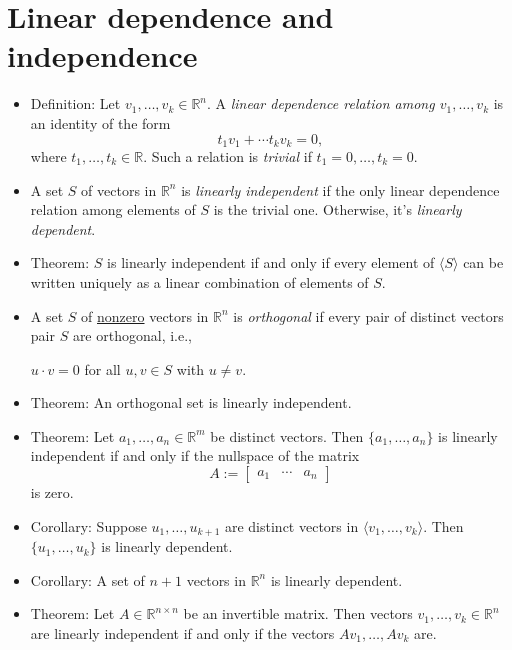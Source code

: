 \documentclass{amsart}
\newcommand{\RR}{\mathbb{R}}
\begin{document}
\section{Linear dependence and independence}
\begin{itemize}
  \setlength{\itemsep}{0.5em}
  \item Definition: Let $v_1,\ldots,v_k\in\RR^n$.
  A \emph{linear dependence relation among $v_1,\ldots,v_k$} is an identity of the form
  $$
  t_1v_1+\cdots t_kv_k=0,
  $$
  where $t_1,\ldots,t_k\in\RR$. Such a relation is \emph{trivial} if $t_1=0,\ldots, t_k=0$.

  \item A set $S$ of vectors in $\RR^n$ is \emph{linearly independent} if the only linear dependence relation among elements of $S$ is the trivial one.
  Otherwise, it's \emph{linearly dependent}.

  \item Theorem: $S$ is linearly independent if and only if every element of $\langle S\rangle$ can be written uniquely as a linear combination of elements of $S$.

  \item A set $S$ of \underline{nonzero} vectors in $\RR^n$ is \emph{orthogonal} if every pair of distinct vectors pair $S$ are orthogonal, i.e.,
  \begin{center}
    $u\cdot v = 0$ for all $u, v\in S$ with $u\neq v$.
  \end{center}

  \item Theorem: An orthogonal set is linearly independent.

  \item Theorem: Let $a_1,\ldots,a_n\in\RR^m$ be distinct vectors.
  Then $\{a_1,\ldots,a_n\}$ is linearly independent if and only if the nullspace of the matrix
  $$
A := \begin{bmatrix}a_1&\cdots &a_n\end{bmatrix}
  $$
  is zero.

  \item Corollary: Suppose $u_1,\ldots,u_{k+1}$ are distinct vectors in $\langle v_1,\ldots,v_k\rangle$.
  Then $\{u_1,\ldots,u_k\}$ is linearly dependent.

  \item Corollary: A set of $n+1$ vectors in $\RR^n$ is linearly dependent.


  \item Theorem: Let $A\in\RR^{n\times n}$ be an invertible matrix.
  Then vectors $v_1,\ldots,v_k\in\RR^n$ are linearly independent if and only if the vectors $Av_1,\ldots,Av_k$ are.


\end{itemize}
\end{document}
